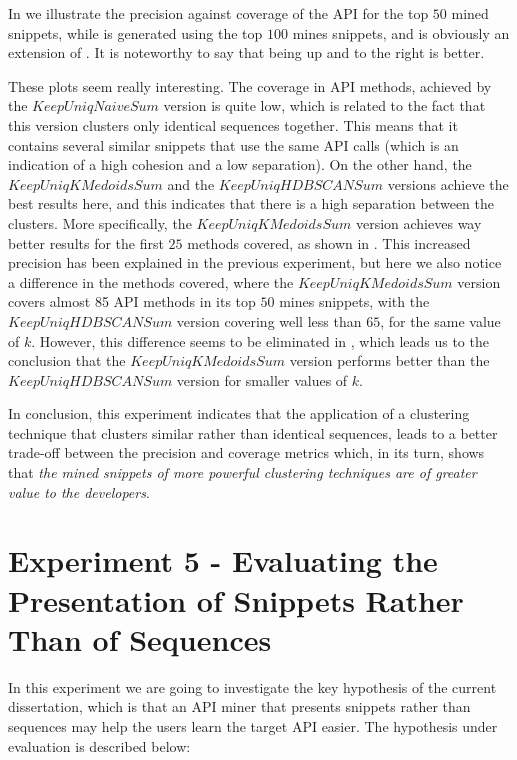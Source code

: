 In  we illustrate the precision against coverage of the API for the top $50$ mined snippets, while  is generated using the top $100$ mines snippets, and is obviously an extension of . It is noteworthy to say that being up and to the right is better.

These plots seem really interesting. The coverage in API methods, achieved by the $KeepUniqNaiveSum$ version is quite low, which is related to the fact that this version clusters only identical sequences together. This means that it contains several similar snippets that use the same API calls (which is an indication of a high cohesion and a low separation). On the other hand, the $KeepUniqKMedoidsSum$ and the $KeepUniqHDBSCANSum$ versions achieve the best results here, and this indicates that there is a high separation between the clusters. More specifically, the $KeepUniqKMedoidsSum$ version achieves way better results for the first $25$ methods covered, as shown in . This increased precision has been explained in the previous experiment, but here we also notice a difference in the methods covered, where the $KeepUniqKMedoidsSum$ version covers almost 85 API methods in its top $50$ mines snippets, with the $KeepUniqHDBSCANSum$ version covering well less than $65$, for the same value of $k$. However, this difference seems to be eliminated in , which leads us to the conclusion that the $KeepUniqKMedoidsSum$ version performs better than the $KeepUniqHDBSCANSum$ version for smaller values of $k$.

In conclusion, this experiment indicates that the application of a clustering technique that clusters similar rather than identical sequences, leads to a better trade-off between the precision and coverage metrics which, in its turn, shows that \textit{the mined snippets of more powerful clustering techniques are of greater value to the developers}.


\section{Experiment 5 - Evaluating the Presentation of Snippets Rather Than of Sequences}
\label{sec:evaluation-exp5}

In this experiment we are going to investigate the key hypothesis of the current dissertation, which is that an API miner that presents snippets rather than sequences may help the users learn the target API easier. The hypothesis under evaluation is described below:


